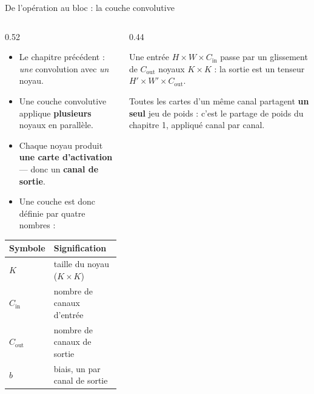 \begin{frame}{De l'opération au bloc : la couche convolutive}
\begin{columns}[t]
\begin{column}{0.52\textwidth}
\begin{itemize}
  \item Le chapitre précédent : \emph{une} convolution avec \emph{un} noyau.
  \item Une couche convolutive applique \textbf{plusieurs} noyaux en parallèle.
  \item Chaque noyau produit \textbf{une carte d'activation} --- donc un
  \textbf{canal de sortie}.
  \item Une couche est donc définie par quatre nombres :
\end{itemize}
\begin{center}
\begin{tabular}{@{}ll@{}}
\toprule
\textbf{Symbole} & \textbf{Signification} \\
\midrule
$K$ & taille du noyau ($K \times K$) \\
$C_{\text{in}}$ & nombre de canaux d'entrée \\
$C_{\text{out}}$ & nombre de canaux de sortie \\
$b$ & biais, un par canal de sortie \\
\bottomrule
\end{tabular}
\end{center}
\end{column}
\begin{column}{0.44\textwidth}
\begin{kbox}
Une entrée $H \times W \times C_{\text{in}}$ passe par un glissement de
$C_{\text{out}}$ noyaux $K \times K$ : la sortie est un tenseur
$H' \times W' \times C_{\text{out}}$.

\medskip
Toutes les cartes d'un même canal partagent \textbf{un seul} jeu de poids :
c'est le partage de poids du chapitre 1, appliqué canal par canal.
\end{kbox}
\end{column}
\end{columns}
\end{frame}

